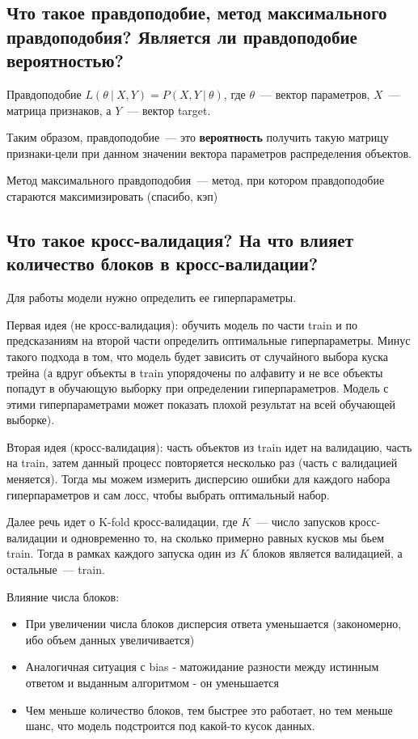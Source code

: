 \subsection{Что такое правдоподобие, метод максимального правдоподобия? Является ли правдоподобие вероятностью?}

\Def Правдоподобие $L(\theta \ | \ X, Y) = P(X, Y \ | \ \theta)$, где $\theta$~--- вектор параметров, $X$~--- матрица признаков, а $Y$~--- вектор target.

Таким образом, правдоподобие~--- это \textbf{вероятность} получить такую матрицу признаки-цели при данном значении вектора параметров распределения объектов.

\Def Метод максимального правдоподобия~--- метод, при котором правдоподобие стараются максимизировать (спасибо, кэп)






\subsection{Что такое кросс-валидация? На что влияет количество блоков в кросс-валидации?}

Для работы модели нужно определить ее гиперпараметры.

Первая идея (не кросс-валидация): обучить модель по части train и по предсказаниям на второй части определить оптимальные гиперпараметры. Минус такого подхода в том, что модель будет зависить от случайного выбора куска трейна (а вдруг объекты в train упорядочены по алфавиту и не все объекты попадут в обучающую выборку при определении гиперпараметров. Модель с этими гиперпараметрами может показать плохой результат на всей обучающей выборке).

Вторая идея (кросс-валидация): часть объектов из train идет на валидацию, часть на train, затем данный процесс повторяется несколько раз (часть с валидацией меняется). Тогда мы можем измерить дисперсию ошибки для каждого набора гиперпараметров и сам лосс, чтобы выбрать оптимальный набор.

\Note Далее речь идет о K-fold кросс-валидации, где $K$~--- число запусков кросс-валидации и одновременно то, на сколько примерно равных кусков мы бьем train. Тогда в рамках каждого запуска один из $K$ блоков является валидацией, а остальные~--- train.


Влияние числа блоков:

\begin{itemize}
    \item При увеличении числа блоков дисперсия ответа уменьшается (закономерно, ибо объем данных увеличивается)
    \item Аналогичная ситуация с bias - матожидание разности между истинным ответом и выданным алгоритмом - он уменьшается
    \item Чем меньше количество блоков, тем быстрее это работает, но тем меньше шанс, что модель подстроится под какой-то кусок данных.
\end{itemize}








